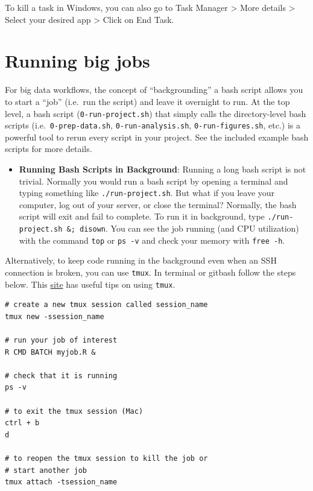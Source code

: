 \documentclass[]{book}
\providecommand{\tightlist}{%
  \setlength{\itemsep}{0pt}\setlength{\parskip}{0pt}}
\begin{document}
To kill a task in Windows, you can also go to Task Manager \textgreater{} More details \textgreater{} Select your desired app \textgreater{} Click on End Task.

\hypertarget{running-big-jobs}{%
\section{Running big jobs}\label{running-big-jobs}}

For big data workflows, the concept of ``backgrounding'' a bash script allows you to start a ``job'' (i.e.~run the script) and leave it overnight to run. At the top level, a bash script (\texttt{0-run-project.sh}) that simply calls the directory-level bash scripts (i.e.~\texttt{0-prep-data.sh}, \texttt{0-run-analysis.sh}, \texttt{0-run-figures.sh}, etc.) is a powerful tool to rerun every script in your project. See the included example bash scripts for more details.

\begin{itemize}
\tightlist
\item
  \textbf{Running Bash Scripts in Background}: Running a long bash script is not trivial. Normally you would run a bash script by opening a terminal and typing something like \texttt{./run-project.sh}. But what if you leave your computer, log out of your server, or close the terminal? Normally, the bash script will exit and fail to complete. To run it in background, type \texttt{./run-project.sh\ \&;\ disown}. You can see the job running (and CPU utilization) with the command \texttt{top} or \texttt{ps\ -v} and check your memory with \texttt{free\ -h}.
\end{itemize}

Alternatively, to keep code running in the background even when an SSH connection is broken, you can use \texttt{tmux}. In terminal or gitbash follow the steps below. This \href{https://medium.com/@jeongwhanchoi/install-tmux-on-osx-and-basics-commands-for-beginners-be22520fd95e}{site} has useful tips on using \texttt{tmux}.

\begin{verbatim}
# create a new tmux session called session_name
tmux new -ssession_name

# run your job of interest
R CMD BATCH myjob.R & 
  
# check that it is running
ps -v

# to exit the tmux session (Mac)
ctrl + b 
d

# to reopen the tmux session to kill the job or 
# start another job
tmux attach -tsession_name 
\end{verbatim}
\end{document}
